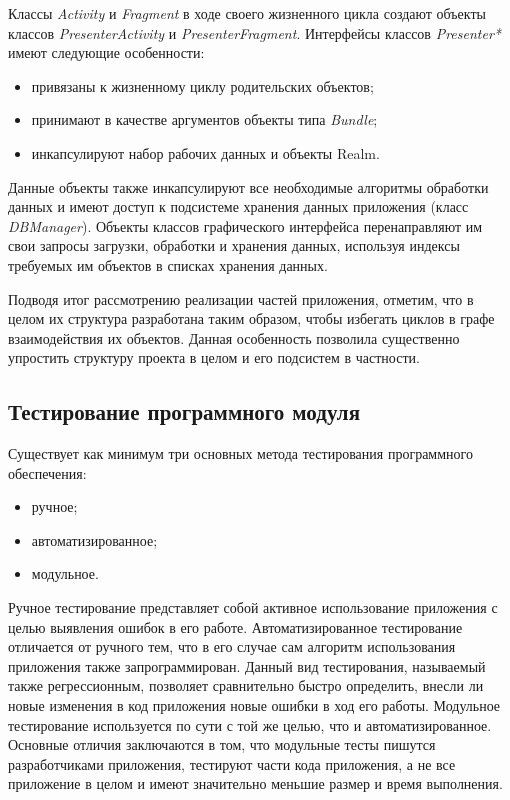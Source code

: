 Классы \textit{Activity} и \textit{Fragment} в ходе своего жизненного цикла
создают объекты классов \textit{PresenterActivity} и \textit{PresenterFragment}.
Интерфейсы классов \textit{Presenter*} имеют следующие особенности:
\begin{itemize}
  \item привязаны к жизненному циклу родительских объектов;
  \item принимают в качестве аргументов объекты типа \textit{Bundle};
  \item инкапсулируют набор рабочих данных и объекты Realm.
\end{itemize}

Данные объекты также инкапсулируют все необходимые алгоритмы обработки данных и
имеют доступ к подсистеме хранения данных приложения (класс \textit{DBManager}).
Объекты классов графического интерфейса перенаправляют
им свои запросы загрузки, обработки и хранения данных,
используя индексы требуемых им объектов в списках хранения данных.

Подводя итог рассмотрению реализации частей приложения, отметим,
что в целом их структура разработана таким образом,
чтобы избегать циклов в графе взаимодействия их объектов.
Данная особенность позволила существенно упростить
структуру проекта в целом и его подсистем в частности.

\subsection{Тестирование программного модуля}

Существует как минимум три основных метода тестирования
программного обеспечения:
\begin{itemize}
\item ручное;
\item автоматизированное;
\item модульное.
\end{itemize}

Ручное тестирование представляет собой активное использование приложения
с целью выявления ошибок в его работе.
Автоматизированное тестирование отличается от ручного тем,
что в его случае сам алгоритм использования приложения также запрограммирован.
Данный вид тестирования, называемый также регрессионным,
позволяет сравнительно быстро определить,
внесли ли новые изменения в код приложения новые ошибки в ход его работы.
Модульное тестирование используется по сути с той же целью,
что и автоматизированное. Основные отличия заключаются в том,
что модульные тесты пишутся разработчиками приложения,
тестируют части кода приложения, а не все приложение в целом
и имеют значительно меньшие размер и время выполнения.

